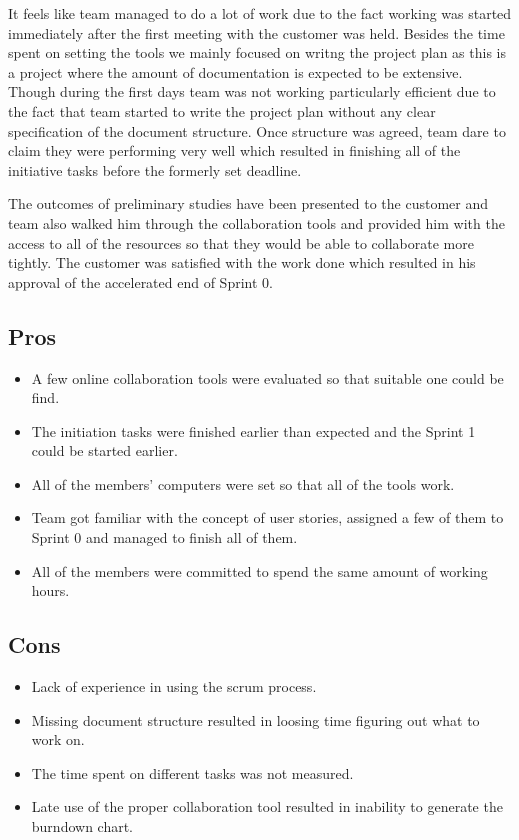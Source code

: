 It feels like team managed to do a lot of work due to the fact working was started immediately after the first meeting with the customer was held. Besides the time spent on setting the tools we mainly focused on writng the project plan as this is a project where the amount of documentation is expected to be extensive. Though during the first days team was not working particularly efficient due to the fact that team started to write the project plan without any clear specification of the document structure. Once structure was agreed, team dare to claim they were performing very well which resulted in finishing all of the initiative tasks before the formerly set deadline.

The outcomes of preliminary studies have been presented to the customer and team also walked him through the collaboration tools and provided him with the access to all of the resources so that they would be able to collaborate more tightly. The customer was satisfied with the work done which resulted in his approval of the accelerated end of Sprint 0.

\subsection{Pros}
\begin{itemize}
\item A few online collaboration tools were evaluated so that suitable one could be find.
\item The initiation tasks were finished earlier than expected and the Sprint 1 could be started earlier.
\item All of the members' computers were set so that all of the tools work.
\item Team got familiar with the concept of user stories, assigned a few of them to Sprint 0 and managed to finish all of them.
\item All of the members were committed to spend the same amount of working hours.
\end{itemize}

\subsection{Cons}
\begin{itemize}
\item Lack of experience in using the scrum process.
\item Missing document structure resulted in loosing time figuring out what to work on.
\item The time spent on different tasks was not measured.
\item Late use of the proper collaboration tool resulted in inability to generate the burndown chart.
\end{itemize}
